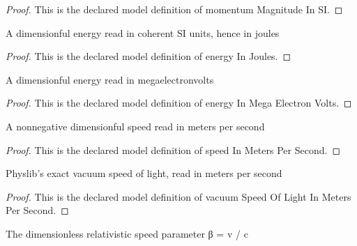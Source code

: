 \begin{proof}
  This is the declared model definition of momentum Magnitude In SI.
\end{proof}
\begin{definition}
  \label{def:physics:phyx-mini-0556:phyxminiproblems-problemphyxmini0556-energyinjoules}
  A dimensionful energy read in coherent SI units, hence in joules
\end{definition}
\begin{proof}
  This is the declared model definition of energy In Joules.
\end{proof}
\begin{definition}
  \label{def:physics:phyx-mini-0556:phyxminiproblems-problemphyxmini0556-energyinmegaelectronvolts}
  A dimensionful energy read in megaelectronvolts
\end{definition}
\begin{proof}
  This is the declared model definition of energy In Mega Electron Volts.
\end{proof}
\begin{definition}
  \label{def:physics:phyx-mini-0556:phyxminiproblems-problemphyxmini0556-speedinmeterspersecond}
  A nonnegative dimensionful speed read in meters per second
\end{definition}
\begin{proof}
  This is the declared model definition of speed In Meters Per Second.
\end{proof}
\begin{definition}
  \label{def:physics:phyx-mini-0556:phyxminiproblems-problemphyxmini0556-vacuumspeedoflightinmeterspersecond}
  Physlib's exact vacuum speed of light, read in meters per second
\end{definition}
\begin{proof}
  This is the declared model definition of vacuum Speed Of Light In Meters Per Second.
\end{proof}
\begin{definition}
  \label{def:physics:phyx-mini-0556:phyxminiproblems-problemphyxmini0556-speedfractionoflight}
  The dimensionless relativistic speed parameter β = v / c
\end{definition}
